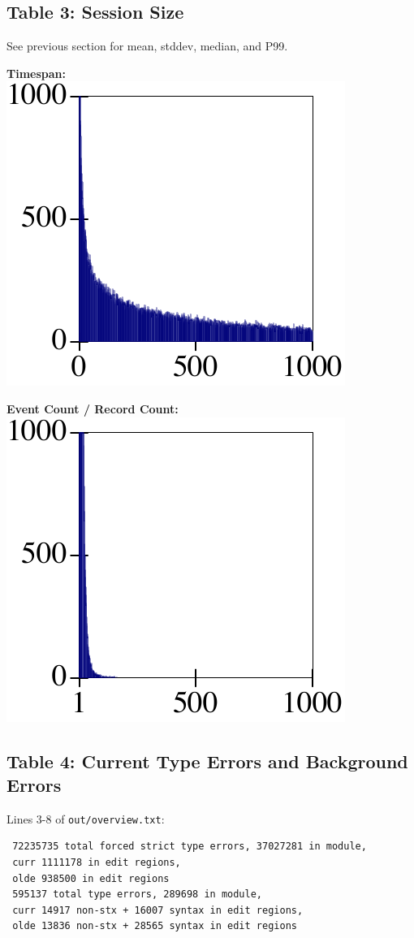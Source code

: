\documentclass{article}
\begin{document}
\subsection*{Table 3: Session Size}

See previous section for mean, stddev, median, and P99.

\begin{minipage}{0.5\columnwidth}
  \textbf{Timespan:}\\
  \includegraphics[width=0.4\columnwidth]{out/timespan-distribution.pdf}
\end{minipage}\begin{minipage}{0.5\columnwidth}
  \textbf{Event Count / Record Count:}\\
  \includegraphics[width=0.4\columnwidth]{out/event-count-distribution.pdf}
\end{minipage}


\subsection*{Table 4: Current Type Errors and Background Errors}

Lines 3-8 of \texttt{out/overview.txt}:

\begin{verbatim}
 72235735 total forced strict type errors, 37027281 in module,
 curr 1111178 in edit regions,
 olde 938500 in edit regions
 595137 total type errors, 289698 in module,
 curr 14917 non-stx + 16007 syntax in edit regions,
 olde 13836 non-stx + 28565 syntax in edit regions
\end{verbatim}
\end{document}
